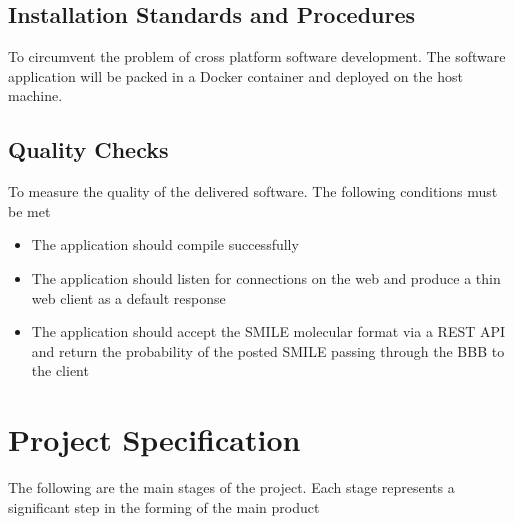 \documentclass[a4paper,12pt]{article}
\begin{document}
		\subsection{Installation Standards and Procedures}
		To circumvent the problem of cross platform software development. The software application will be packed in a Docker container and deployed on the host machine.
		\subsection{Quality Checks}
		To measure the quality of the delivered software. The following conditions must be met
		\begin{itemize}
			\item The application should compile successfully 
			\item The application should listen for connections on the web and produce a thin web client as a default response
			\item The application should accept the SMILE molecular format via a REST API and return the probability of the posted SMILE passing through the BBB to the client
		\end{itemize}
	
	
	\section{Project Specification}
	The following are the main stages of the project. Each stage represents a significant step in the forming of the main product
\end{document}
